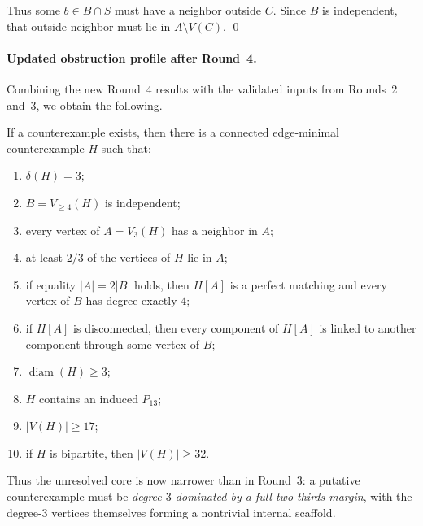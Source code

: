 Thus some $b\in B\cap S$ must have a neighbor outside $C$. Since $B$ is independent, that outside neighbor must lie in $A\setminus V(C)$. \qed

\paragraph{Updated obstruction profile after Round~4.}
Combining the new Round~4 results with the validated inputs from Rounds~2 and~3, we obtain the following.

If a counterexample exists, then there is a connected edge-minimal counterexample $H$ such that:
\begin{enumerate}
  \item $\delta(H)=3$;
  \item $B=V_{\ge 4}(H)$ is independent;
  \item every vertex of $A=V_3(H)$ has a neighbor in $A$;
  \item at least $2/3$ of the vertices of $H$ lie in $A$;
  \item if equality $|A|=2|B|$ holds, then $H[A]$ is a perfect matching and every vertex of $B$ has degree exactly $4$;
  \item if $H[A]$ is disconnected, then every component of $H[A]$ is linked to another component through some vertex of $B$;
  \item $\operatorname{diam}(H)\ge 3$;
  \item $H$ contains an induced $P_{13}$;
  \item $|V(H)|\ge 17$;
  \item if $H$ is bipartite, then $|V(H)|\ge 32$.
\end{enumerate}
Thus the unresolved core is now narrower than in Round~3: a putative counterexample must be \emph{degree-$3$-dominated by a full two-thirds margin}, with the degree-$3$ vertices themselves forming a nontrivial internal scaffold.

